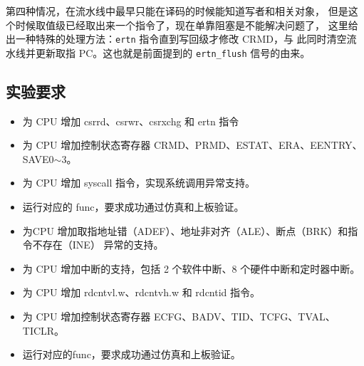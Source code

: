 第四种情况，在流水线中最早只能在译码的时候能知道写者和相关对象，
但是这个时候取值级已经取出来一个指令了，现在单靠阻塞是不能解决问题了，
这里给出一种特殊的处理方法：\texttt{ertn} 指令直到写回级才修改 CRMD，与
此同时清空流水线并更新取指 PC。这也就是前面提到的 \texttt{ertn\_flush} 信号的由来。

\subsection{实验要求}

\begin{itemize}
    \item 为 CPU 增加 csrrd、csrwr、csrxchg 和 ertn 指令
    \item 为 CPU 增加控制状态寄存器 CRMD、PRMD、ESTAT、ERA、EENTRY、SAVE0$\sim$3。
    \item 为 CPU 增加 syscall 指令，实现系统调用异常支持。
    \item 运行对应的 func，要求成功通过仿真和上板验证。
\end{itemize}

\begin{itemize}
    \item 为CPU 增加取指地址错（ADEF）、地址非对齐（ALE）、断点（BRK）和指令不存在（INE）
    异常的支持。
    \item 为 CPU 增加中断的支持，包括 2 个软件中断、8 个硬件中断和定时器中断。
    \item 为 CPU 增加 rdcntvl.w、rdcntvh.w 和 rdcntid 指令。
    \item 为 CPU 增加控制状态寄存器 ECFG、BADV、TID、TCFG、TVAL、TICLR。
    \item 运行对应的func，要求成功通过仿真和上板验证。
\end{itemize}

